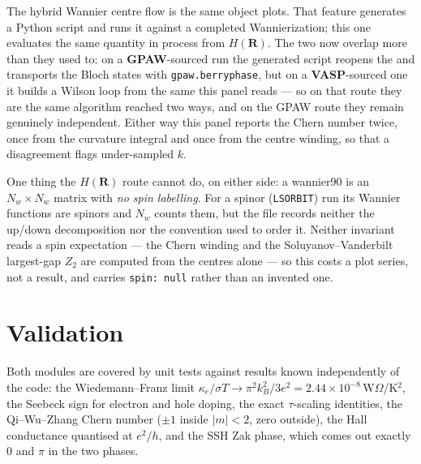 The hybrid Wannier centre flow is the same object
\menusep{} plots.
That feature generates a Python script and runs it against a completed
Wannierization; this one evaluates the same quantity in process from
$H(\mathbf{R})$. The two now overlap more than they used to: on a
\textbf{GPAW}-sourced run the generated script reopens the  and
transports the Bloch states with \texttt{gpaw.berryphase}, but on a
\textbf{VASP}-sourced one it builds a Wilson loop from the same
 this panel reads --- so on that route they are the same
algorithm reached two ways, and on the GPAW route they remain genuinely
independent. Either way this panel reports the Chern number twice, once from
the curvature integral and once from the centre winding, so that a
disagreement flags under-sampled $k$.

One thing the $H(\mathbf{R})$ route cannot do, on either side: a wannier90
 is an $N_w \times N_w$ matrix with \emph{no spin labelling}.
For a spinor (\texttt{LSORBIT}) run its Wannier functions are spinors and
$N_w$ counts them, but the file records neither the up/down decomposition nor
the convention used to order it. Neither invariant reads a spin expectation
--- the Chern winding and the Soluyanov--Vanderbilt largest-gap $Z_2$
are computed from the centres alone --- so this costs a plot series, not a
result, and  carries \texttt{spin: null} rather than an
invented one.

\section{Validation}

Both modules are covered by unit tests against results known independently of
the code: the Wiedemann--Franz limit
$\kappa_e/\sigma T \to \pi^2 k_B^2/3e^2 = 2.44\times10^{-8}$\,W$\Omega$/K$^2$,
the Seebeck sign for electron and hole doping, the exact $\tau$-scaling
identities, the Qi--Wu--Zhang Chern number ($\pm1$ inside $|m|<2$, zero
outside), the Hall conductance quantised at $e^2/h$, and the SSH Zak phase,
which comes out exactly $0$ and $\pi$ in the two phases.
